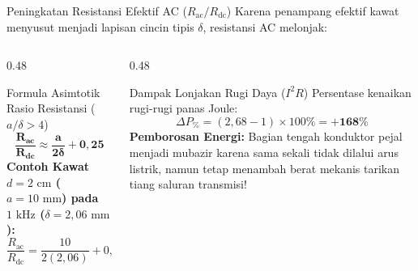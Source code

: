 \documentclass[aspectratio=169,10pt]{beamer}
\begin{document}
\begin{frame}{Peningkatan Resistansi Efektif AC ($R_{\text{ac}}/R_{\text{dc}}$)}
  Karena penampang efektif kawat menyusut menjadi lapisan cincin tipis $\delta$, resistansi AC melonjak:
  \vspace{0.1cm}
  \begin{columns}[t]
    \begin{column}{0.48\textwidth}
      \begin{block}{Formula Asimtotik Rasio Resistansi ($a/\delta > 4$)}
        \small
        \begin{equation*}
          \mathbf{\frac{R_{\text{ac}}}{R_{\text{dc}}} \approx \frac{a}{2\delta} + 0{,}25}
        \end{equation*}
        \textbf{Contoh Kawat $d = 2\text{ cm}$ ($a = 10\text{ mm}$) pada $1\text{ kHz}$ ($\delta = 2{,}06\text{ mm}$):}
        \begin{equation*}
          \frac{R_{\text{ac}}}{R_{\text{dc}}} = \frac{10}{2(2{,}06)} + 0{,}25 = 2{,}427 + 0{,}25 = \mathbf{2{,}68}
        \end{equation*}
      \end{block}
    \end{column}
    \begin{column}{0.48\textwidth}
      \begin{alertblock}{Dampak Lonjakan Rugi Daya ($I^2 R$)}
        \small
        Persentase kenaikan rugi-rugi panas Joule:
        \begin{equation*}
          \Delta P_{\%} = (2{,}68 - 1) \times 100\% = \mathbf{+168\%}
        \end{equation*}
        \textbf{Pemborosan Energi:}
        Bagian tengah konduktor pejal menjadi mubazir karena sama sekali tidak dilalui arus listrik, namun tetap menambah berat mekanis tarikan tiang saluran transmisi!
      \end{alertblock}
    \end{column}
  \end{columns}
\end{frame}
\end{document}
